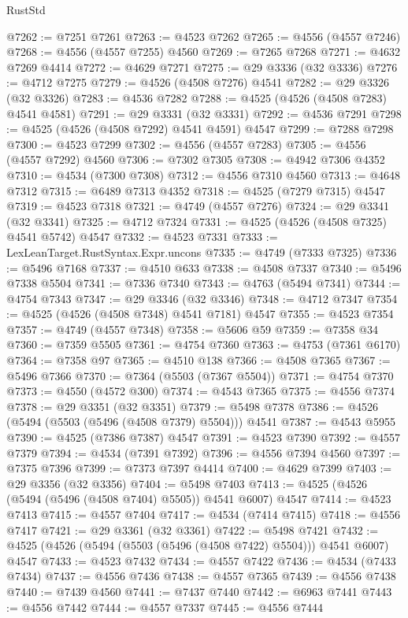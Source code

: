 \begin{lexlean}{RustStd}
\begin{coremodule}
@7262 := @7251 @7261
@7263 := @4523 @7262
@7265 := @4556 (@4557 @7246)
@7268 := @4556 (@4557 @7255) @4560
@7269 := @7265 @7268
@7271 := @4632 @7269 @4414
@7272 := @4629 @7271
@7275 := @29 @3336 (@32 @3336)
@7276 := @4712 @7275
@7279 := @4526 (@4508 @7276) @4541
@7282 := @29 @3326 (@32 @3326)
@7283 := @4536 @7282
@7288 := @4525 (@4526 (@4508 @7283) @4541 @4581)
@7291 := @29 @3331 (@32 @3331)
@7292 := @4536 @7291
@7298 := @4525 (@4526 (@4508 @7292) @4541 @4591) @4547
@7299 := @7288 @7298
@7300 := @4523 @7299
@7302 := @4556 (@4557 @7283)
@7305 := @4556 (@4557 @7292) @4560
@7306 := @7302 @7305
@7308 := @4942 @7306 @4352
@7310 := @4534 (@7300 @7308)
@7312 := @4556 @7310 @4560
@7313 := @4648 @7312
@7315 := @6489 @7313 @4352
@7318 := @4525 (@7279 @7315) @4547
@7319 := @4523 @7318
@7321 := @4749 (@4557 @7276)
@7324 := @29 @3341 (@32 @3341)
@7325 := @4712 @7324
@7331 := @4525 (@4526 (@4508 @7325) @4541 @5742) @4547
@7332 := @4523 @7331
@7333 := LexLeanTarget.RustSyntax.Expr.uncons
@7335 := @4749 (@7333 @7325)
@7336 := @5496 @7168
@7337 := @4510 @633
@7338 := @4508 @7337
@7340 := @5496 @7338 @5504
@7341 := @7336 @7340
@7343 := @4763 (@5494 @7341)
@7344 := @4754 @7343
@7347 := @29 @3346 (@32 @3346)
@7348 := @4712 @7347
@7354 := @4525 (@4526 (@4508 @7348) @4541 @7181) @4547
@7355 := @4523 @7354
@7357 := @4749 (@4557 @7348)
@7358 := @5606 @59
@7359 := @7358 @34
@7360 := @7359 @5505
@7361 := @4754 @7360
@7363 := @4753 (@7361 @6170)
@7364 := @7358 @97
@7365 := @4510 @138
@7366 := @4508 @7365
@7367 := @5496 @7366
@7370 := @7364 (@5503 (@7367 @5504))
@7371 := @4754 @7370
@7373 := @4550 (@4572 @300)
@7374 := @4543 @7365
@7375 := @4556 @7374
@7378 := @29 @3351 (@32 @3351)
@7379 := @5498 @7378
@7386 := @4526 (@5494 (@5503 (@5496 (@4508 @7379) @5504))) @4541
@7387 := @4543 @5955
@7390 := @4525 (@7386 @7387) @4547
@7391 := @4523 @7390
@7392 := @4557 @7379
@7394 := @4534 (@7391 @7392)
@7396 := @4556 @7394 @4560
@7397 := @7375 @7396
@7399 := @7373 @7397 @4414
@7400 := @4629 @7399
@7403 := @29 @3356 (@32 @3356)
@7404 := @5498 @7403
@7413 := @4525 (@4526 (@5494 (@5496 (@4508 @7404) @5505)) @4541 @6007) @4547
@7414 := @4523 @7413
@7415 := @4557 @7404
@7417 := @4534 (@7414 @7415)
@7418 := @4556 @7417
@7421 := @29 @3361 (@32 @3361)
@7422 := @5498 @7421
@7432 := @4525 (@4526 (@5494 (@5503 (@5496 (@4508 @7422) @5504))) @4541 @6007) @4547
@7433 := @4523 @7432
@7434 := @4557 @7422
@7436 := @4534 (@7433 @7434)
@7437 := @4556 @7436
@7438 := @4557 @7365
@7439 := @4556 @7438
@7440 := @7439 @4560
@7441 := @7437 @7440
@7442 := @6963 @7441
@7443 := @4556 @7442
@7444 := @4557 @7337
@7445 := @4556 @7444

\end{coremodule}
\end{lexlean}
